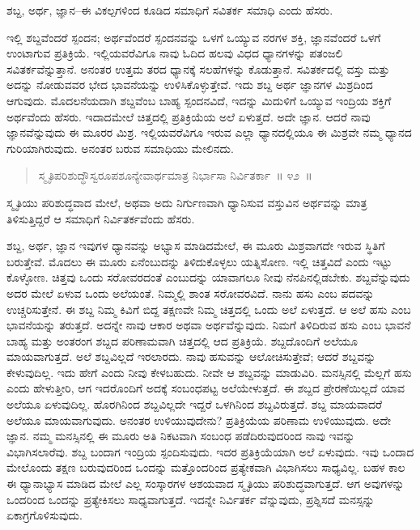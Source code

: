 \vspace{-0.3cm}

ಶಬ್ದ, ಅರ್ಥ, ಜ್ಞಾನ–ಈ ವಿಕಲ್ಪಗಳಿಂದ ಕೂಡಿದ ಸಮಾಧಿಗೆ ಸವಿತರ್ಕ ಸಮಾಧಿ ಎಂದು ಹೆಸರು. 

ಇಲ್ಲಿ ಶಬ್ದವೆಂದರೆ ಸ್ಪಂದನ; ಅರ್ಥವೆಂದರೆ ಸ್ಪಂದನವನ್ನು ಒಳಗೆ ಒಯ್ಯುವ ನರಗಳ ಶಕ್ತಿ, ಜ್ಞಾನವೆಂದರೆ ಒಳಗೆ ಉಂಟಾಗುವ ಪ್ರತಿಕ್ರಿಯೆ. ಇಲ್ಲಿಯವರೆವಿಗೂ ನಾವು ಓದಿದ ಹಲವು ವಿಧದ ಧ್ಯಾನಗಳನ್ನು ಪತಂಜಲಿ ಸವಿತರ್ಕವೆನ್ನುತ್ತಾನೆ. ಅನಂತರ ಉತ್ತಮ ತರದ ಧ್ಯಾನಕ್ಕೆ ಸಲಹೆಗಳನ್ನು ಕೊಡುತ್ತಾನೆ. ಸವಿತರ್ಕದಲ್ಲಿ ವಸ್ತು ಮತ್ತು ಅದನ್ನು ನೋಡುವವರ ಭೇದ ಭಾವನೆಯನ್ನು ಉಳಿಸಿಕೊಳ್ಳುತ್ತೇವೆ. ಇದು ಶಬ್ದ ಅರ್ಥ ಜ್ಞಾನಗಳ ಮಿಶ್ರದಿಂದ ಆಗುವುದು. ಮೊದಲನೆಯದಾಗಿ ಶಬ್ದವೆಂಬ ಬಾಹ್ಯ ಸ್ಪಂದನವಿದೆ, ಇದನ್ನು ಮಿದುಳಿಗೆ ಒಯ್ಯುವ ಇಂದ್ರಿಯ ಶಕ್ತಿಗೆ ಅರ್ಥವೆಂದು ಹೆಸರು. ಇದಾದಮೇಲೆ ಚಿತ್ತದಲ್ಲಿ ಪ್ರತಿಕ್ರಿಯೆಯ ಅಲೆ ಏಳುತ್ತದೆ. ಅದೇ ಜ್ಞಾನ. ಆದರೆ ನಾವು ಜ್ಞಾನವೆನ್ನುವುದು ಈ ಮೂರರ ಮಿಶ್ರ. ಇಲ್ಲಿಯವರೆವಿಗೂ ಇರುವ ಎಲ್ಲಾ ಧ್ಯಾನದಲ್ಲಿಯೂ ಈ ಮಿಶ್ರವೇ ನಮ್ಮ ಧ್ಯಾನದ ಗುರಿಯಾಗಿರುವುದು. ಅನಂತರ ಬರುವ ಸಮಾಧಿಯು ಮೇಲಿನದು. 

\vspace{-0.3cm}

\begin{verse}
ಸ್ಮೃತಿಪರಿಶುದ್ಧೌಸ್ವರೂಪಶೂನ್ಯೇವಾರ್ಥಮಾತ್ರ ನಿರ್ಭಾಸಾ ನಿರ್ವಿತರ್ಕಾ~॥ ೪೨~॥
\end{verse}

\vspace{-0.3cm}

ಸ್ಮೃತಿಯು ಪರಿಶುದ್ಧವಾದ ಮೇಲೆ, ಅಥವಾ ಅದು ನಿರ್ಗುಣವಾಗಿ ಧ್ಯಾನಿಸುವ ವಸ್ತುವಿನ ಅರ್ಥವನ್ನು ಮಾತ್ರ ತಿಳಿಸುತ್ತಿದ್ದರೆ ಆ ಸಮಾಧಿಗೆ ನಿರ್ವಿತರ್ಕವೆಂದು ಹೆಸರು. 

ಶಬ್ದ, ಅರ್ಥ, ಜ್ಞಾನ ಇವುಗಳ ಧ್ಯಾನವನ್ನು ಅಭ್ಯಾಸ ಮಾಡಿದಮೇಲೆ, ಈ ಮೂರು ಮಿಶ್ರವಾಗದೇ ಇರುವ ಸ್ಥಿತಿಗೆ ಬರುತ್ತೇವೆ. ಮೊದಲು ಈ ಮೂರು ಏನೆಂಬುದನ್ನು ತಿಳಿದುಕೊಳ್ಳಲು ಯತ್ನಿಸೋಣ. ಇಲ್ಲಿ ಚಿತ್ತವಿದೆ ಎಂದು ಇಟ್ಟು ಕೊಳ್ಳೋಣ. ಚಿತ್ತವು ಒಂದು ಸರೋವರದಂತೆ ಎಂಬುದನ್ನು ಯಾವಾಗಲೂ ನೀವು ನೆನಪಿನಲ್ಲಿಡಬೇಕು. ಶಬ್ದವೆನ್ನುವುದು ಅದರ ಮೇಲೆ ಏಳುವ ಒಂದು ಅಲೆಯಂತೆ. ನಿಮ್ಮಲ್ಲಿ ಶಾಂತ ಸರೋವರವಿದೆ. ನಾನು ಹಸು ಎಂಬ ಪದವನ್ನು ಉಚ್ಚರಿಸುತ್ತೇನೆ. ಈ ಶಬ್ದ ನಿಮ್ಮ ಕಿವಿಗೆ ಬಿದ್ದ ತಕ್ಷಣವೇ ನಿಮ್ಮ ಚಿತ್ತದಲ್ಲಿ ಒಂದು ಅಲೆ ಏಳುತ್ತದೆ. ಆ ಅಲೆ ಹಸು ಎಂಬ ಭಾವನೆಯನ್ನು ತರುತ್ತದೆ. ಅದನ್ನೇ ನಾವು ಆಕಾರ ಅಥವಾ ಅರ್ಥವೆನ್ನುವುದು. ನಿಮಗೆ ತಿಳಿದಿರುವ ಹಸು ಎಂಬ ಭಾವನೆ ಬಾಹ್ಯ ಮತ್ತು ಅಂತರಂಗ ಶಬ್ದದ ಪರಿಣಾಮವಾಗಿ ಚಿತ್ತದಲ್ಲಿ ಆದ ಪ್ರತಿಕ್ರಿಯೆ. ಶಬ್ದದೊಂದಿಗೆ ಅಲೆಯೂ ಮಾಯವಾಗುತ್ತದೆ. ಅಲೆ ಶಬ್ದವಿಲ್ಲದೆ ಇರಲಾರದು. ನಾವು ಹಸುವನ್ನು ಆಲೋಚಿಸುತ್ತೇವೆ; ಆದರೆ ಶಬ್ದವನ್ನು ಕೇಳುವುದಿಲ್ಲ. ಇದು ಹೇಗೆ ಎಂದು ನೀವು ಕೇಳಬಹುದು. ನೀವೇ ಆ ಶಬ್ದವನ್ನು ಮಾಡುವಿರಿ. ಮನಸ್ಸಿನಲ್ಲಿ ಮೆಲ್ಲಗೆ ಹಸು ಎಂದು ಹೇಳುತ್ತೀರಿ, ಆಗ ಇದರೊಂದಿಗೆ ಅದಕ್ಕೆ ಸಂಬಂಧಪಟ್ಟ ಅಲೆಯೇಳುತ್ತದೆ. ಈ ಶಬ್ದದ ಪ್ರೇರಣೆಯಿಲ್ಲದೆ ಯಾವ ಅಲೆಯೂ ಏಳುವುದಿಲ್ಲ. ಹೊರಗಿನಿಂದ ಶಬ್ದವಿಲ್ಲದೇ ಇದ್ದರೆ ಒಳಗಿನಿಂದ ಶಬ್ದವಿರುತ್ತದೆ. ಶಬ್ದ ಮಾಯವಾದರೆ ಅಲೆಯೂ ಮಾಯವಾಗುವುದು. ಅನಂತರ ಉಳಿಯುವುದೇನು? ಪ್ರತಿಕ್ರಿಯೆಯ ಪರಿಣಾಮ ಉಳಿಯುವುದು. ಅದೇ ಜ್ಞಾನ. ನಮ್ಮ ಮನಸ್ಸಿನಲ್ಲಿ ಈ ಮೂರು ಅತಿ ನಿಕಟವಾಗಿ ಸಂಬಂಧ ಪಡೆದಿರುವುದರಿಂದ ನಾವು ಇವನ್ನು ವಿಭಾಗಿಸಲಾರೆವು. ಶಬ್ದ ಬಂದಾಗ ಇಂದ್ರಿಯ ಸ್ಪಂದಿಸುವುದು. ಇದರ ಪ್ರತಿಕ್ರಿಯೆಯಾಗಿ ಅಲೆ ಏಳುವುದು. ಇವು ಒಂದಾದ ಮೇಲೊಂದು ತಕ್ಷಣ ಬರುವುದರಿಂದ ಒಂದನ್ನು ಮತ್ತೊಂದರಿಂದ ಪ್ರತ್ಯೇಕವಾಗಿ ವಿಭಾಗಿಸಲು ಸಾಧ್ಯವಿಲ್ಲ. ಬಹಳ ಕಾಲ ಈ ಧ್ಯಾನಾಭ್ಯಾಸ ಮಾಡಿದ ಮೇಲೆ ಎಲ್ಲ ಸಂಸ್ಕಾರಗಳ ಆಶಯವಾದ ಸ್ಮೃತಿಯು ಪರಿಶುದ್ಧವಾಗುತ್ತದೆ. ಆಗ ಅವುಗಳನ್ನು ಒಂದರಿಂದ ಒಂದನ್ನು ಪ್ರತ್ಯೇಕಿಸಲು ಸಾಧ್ಯವಾಗುತ್ತದೆ. ಇದನ್ನೇ ನಿರ್ವಿತರ್ಕ ವೆನ್ನುವುದು, ಪ್ರಶ್ನಿಸದೆ ಮನಸ್ಸನ್ನು ಏಕಾಗ್ರಗೊಳಿಸುವುದು. 

